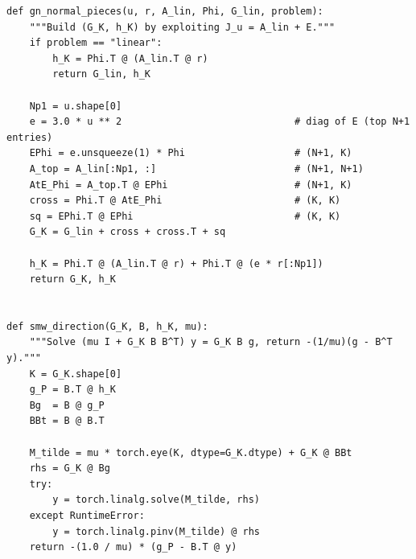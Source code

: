 \documentclass[11pt,a4paper]{article}
\newcommand{\GK}{G_{K}}
\begin{document}
\begin{lstlisting}[caption={Method 1: structural $\GK$ assembly and SMW direction solver.},label={lst:m1}]
def gn_normal_pieces(u, r, A_lin, Phi, G_lin, problem):
    """Build (G_K, h_K) by exploiting J_u = A_lin + E."""
    if problem == "linear":
        h_K = Phi.T @ (A_lin.T @ r)
        return G_lin, h_K

    Np1 = u.shape[0]
    e = 3.0 * u ** 2                              # diag of E (top N+1 entries)
    EPhi = e.unsqueeze(1) * Phi                   # (N+1, K)
    A_top = A_lin[:Np1, :]                        # (N+1, N+1)
    AtE_Phi = A_top.T @ EPhi                      # (N+1, K)
    cross = Phi.T @ AtE_Phi                       # (K, K)
    sq = EPhi.T @ EPhi                            # (K, K)
    G_K = G_lin + cross + cross.T + sq

    h_K = Phi.T @ (A_lin.T @ r) + Phi.T @ (e * r[:Np1])
    return G_K, h_K


def smw_direction(G_K, B, h_K, mu):
    """Solve (mu I + G_K B B^T) y = G_K B g, return -(1/mu)(g - B^T y)."""
    K = G_K.shape[0]
    g_P = B.T @ h_K
    Bg  = B @ g_P
    BBt = B @ B.T

    M_tilde = mu * torch.eye(K, dtype=G_K.dtype) + G_K @ BBt
    rhs = G_K @ Bg
    try:
        y = torch.linalg.solve(M_tilde, rhs)
    except RuntimeError:
        y = torch.linalg.pinv(M_tilde) @ rhs
    return -(1.0 / mu) * (g_P - B.T @ y)
\end{lstlisting}
\end{document}
